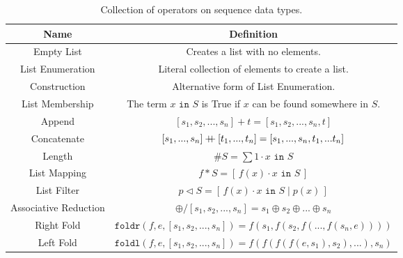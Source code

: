 \documentclass{article}
\newcommand{\List}[3]{%
  [\, #1 \cdot #2 \mid #3 \, ]%
}
\newcommand{\ListT}[2]{%
  [\, #1 \cdot #2 \, ]%
}
\newcommand{\concat}{%
  \mathbin{{+}\mspace{-8mu}{+}}%
}
\begin{document}
\begin{table}[H]
    \centering
    \caption{Collection of operators on sequence data types.}
    \begin{tabular}{|c|c|}
        \hline
        Name & Definition \\ %
        \hline
        Empty List & Creates a list with no elements.\\ %
        List Enumeration & Literal collection of elements to create a list.\\ %
        Construction & Alternative form of List Enumeration.\\ %
        List Membership & The term $x \texttt{ in } S$ is True if $x$ can be found somewhere in $S$. \\ %
        \hline
        Append & $[s_1, s_2, ..., s_n] + t = [s_1, s_2, ..., s_n, t]$ \\ %
        Concatenate & $[s_1, ..., s_n] \concat [t_1, ..., t_n] = [s_1, ..., s_n, t_1, ... t_n]$ \\ %
        Length & $\#S = \sum 1 \cdot x \texttt{ in } S$ \\ %
        \hline
        List Mapping & $f * S = \ListT{f(x)}{x \texttt{ in } S}$\\ %
        List Filter & $p \triangleleft S = \List{f(x)}{x \texttt{ in } S}{p(x)}$\\ %
        Associative Reduction & $\oplus / [s_1, s_2, ..., s_n] = s_1 \oplus s_2 \oplus ... \oplus s_n$\\ %
        Right Fold & $\texttt{foldr}(f, e, [s_1, s_2, ..., s_n]) = f(s_1 ,f(s_2 , f(..., f(s_n, e))))$\\ %
        Left Fold & $\texttt{foldl}(f, e, [s_1, s_2, ..., s_n]) = f(f(f(f(e, s_1), s_2), ...), s_n)$\\ %
        \hline
    \end{tabular}
    \label{tab:seqOps}
\end{table}
\end{document}
